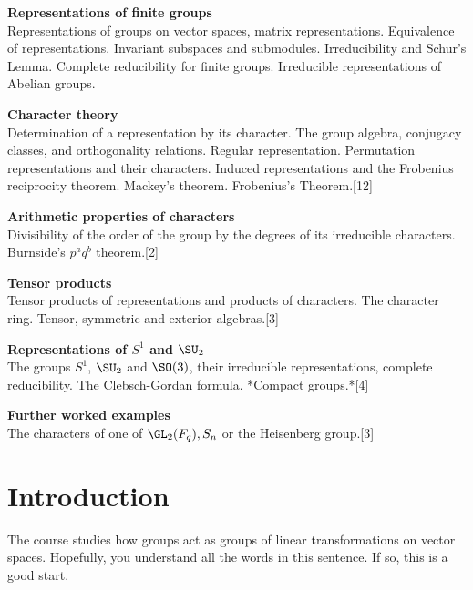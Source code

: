 \documentclass[a4paper]{article}
\begin{document}
\maketitle
{\small
\noindent\textbf{Representations of finite groups}\\
Representations of groups on vector spaces, matrix representations. Equivalence of representations. Invariant subspaces and submodules. Irreducibility and Schur's Lemma. Complete reducibility for finite groups. Irreducible representations of Abelian groups.

\vspace{10pt}
\noindent\textbf{Character theory}\\
Determination of a representation by its character. The group algebra, conjugacy classes, and orthogonality relations. Regular representation. Permutation representations and their characters. Induced representations and the Frobenius reciprocity theorem. Mackey's theorem. Frobenius's Theorem.\hspace*{\fill}[12]

\vspace{10pt}
\noindent\textbf{Arithmetic properties of characters}\\
Divisibility of the order of the group by the degrees of its irreducible characters. Burnside's $p^a q^b$ theorem.\hspace*{\fill}[2]

\vspace{10pt}
\noindent\textbf{Tensor products}\\
Tensor products of representations and products of characters. The character ring. Tensor, symmetric and exterior algebras.\hspace*{\fill}[3]

\vspace{10pt}
\noindent\textbf{Representations of $S^1$ and $\SU_2$}\\
The groups $S^1$, $\SU_2$ and $\SO(3)$, their irreducible representations, complete reducibility. The Clebsch-Gordan formula. *Compact groups.*\hspace*{\fill}[4]

\vspace{10pt}
\noindent\textbf{Further worked examples}\\
The characters of one of $\GL_2(F_q), S_n$ or the Heisenberg group.\hspace*{\fill}[3]%
}

\tableofcontents
\setcounter{section}{-1}
\section{Introduction}
The course studies how groups act as groups of linear transformations on vector spaces. Hopefully, you understand all the words in this sentence. If so, this is a good start.
\end{document}
